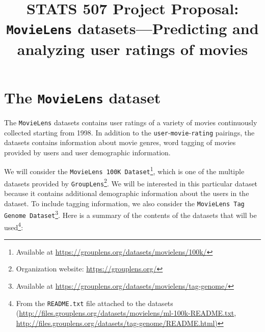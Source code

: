 \documentclass[bj, preprint]{imsart}
\begin{document}
\begin{frontmatter}

\title{{\Large STATS 507 Project Proposal:} \\ 
\bf \texttt{MovieLens} datasets---Predicting and analyzing user ratings of movies}






\end{frontmatter}



\section{The \texttt{MovieLens} dataset}\label{sec:setting}

The \texttt{MovieLens} datasets \citep{harper2015MovieLensDatasetsHistory} contains user ratings of a variety of movies continuously collected starting from 1998. 
In addition to the \texttt{user}-\texttt{movie}-\texttt{rating} pairings, the datasets contains information about movie genres, word tagging of movies provided by users and user demographic information. 

We will consider the \texttt{MovieLens 100K Dataset}\footnote{Available at \url{https://grouplens.org/datasets/movielens/100k/}}, which is one of the multiple datasets provided by \texttt{GroupLens}\footnote{Organization website: \url{https://grouplens.org/}}. 
We will be interested in this particular dataset because it contains additional demographic information about the users in the dataset. 
To include tagging information, we also consider the \texttt{MovieLens Tag Genome Dataset}\footnote{Available at \url{https://grouplens.org/datasets/movielens/tag-genome/}}. 
Here is a summary of the contents of the datasets that will be used\footnote{From the \texttt{README.txt} file attached to the datasets (\url{http://files.grouplens.org/datasets/movielens/ml-100k-README.txt}, \url{http://files.grouplens.org/datasets/tag-genome/README.html)}}:
\end{document}
